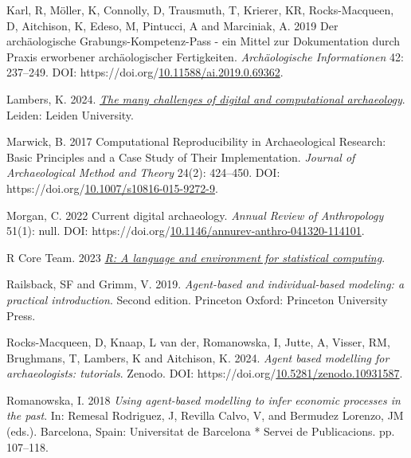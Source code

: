 \documentclass[
]{article}
\newlength{\cslhangindent}
\newlength{\cslentryspacingunit} %
\newenvironment{CSLReferences}[2] %
 {%
  \setlength{\parindent}{0pt}
  \ifodd #1
  \let\oldpar\par
  \def\par{\hangindent=\cslhangindent\oldpar}
  \fi
  \setlength{\parskip}{#2\cslentryspacingunit}
 }%
 {}
\begin{document}
\begin{CSLReferences}{1}{0}
\leavevmode{}%
Karl, R, Möller, K, Connolly, D, Trausmuth, T, Krierer, KR, Rocks-Macqueen, D, Aitchison, K, Edeso, M, Pintucci, A and Marciniak, A. 2019 Der archäologische Grabungs-Kompetenz-Pass - ein Mittel zur Dokumentation durch Praxis erworbener archäologischer Fertigkeiten. \emph{Archäologische Informationen} 42: 237--249. DOI: https://doi.org/\href{https://doi.org/10.11588/ai.2019.0.69362}{10.11588/ai.2019.0.69362}.

\leavevmode{}%
Lambers, K. 2024. \emph{\href{https://hdl.handle.net/1887/4054691}{The many challenges of digital and computational archaeology}}. Leiden: Leiden University.

\leavevmode{}%
Marwick, B. 2017 Computational Reproducibility in Archaeological Research: Basic Principles and a Case Study of Their Implementation. \emph{Journal of Archaeological Method and Theory} 24(2): 424--450. DOI: https://doi.org/\href{https://doi.org/10.1007/s10816-015-9272-9}{10.1007/s10816-015-9272-9}.

\leavevmode{}%
Morgan, C. 2022 Current digital archaeology. \emph{Annual Review of Anthropology} 51(1): null. DOI: https://doi.org/\href{https://doi.org/10.1146/annurev-anthro-041320-114101}{10.1146/annurev-anthro-041320-114101}.

\leavevmode{}%
R Core Team. 2023 \emph{\href{https://www.R-project.org/}{R: A language and environment for statistical computing}}.

\leavevmode{}%
Railsback, SF and Grimm, V. 2019. \emph{Agent-based and individual-based modeling: a practical introduction}. Second edition. Princeton Oxford: Princeton University Press.

\leavevmode{}%
Rocks-Macqueen, D, Knaap, L van der, Romanowska, I, Jutte, A, Visser, RM, Brughmans, T, Lambers, K and Aitchison, K. 2024. \emph{Agent based modelling for archaeologists: tutorials}. Zenodo. DOI: https://doi.org/\href{https://doi.org/10.5281/zenodo.10931587}{10.5281/zenodo.10931587}.

\leavevmode{}%
Romanowska, I. 2018 \emph{Using agent-based modelling to infer economic processes in the past}. In: Remesal Rodriguez, J, Revilla Calvo, V, and Bermudez Lorenzo, JM (eds.). Barcelona, Spain: Universitat de Barcelona * Servei de Publicacions. pp. 107--118.


\end{CSLReferences}
\end{document}
